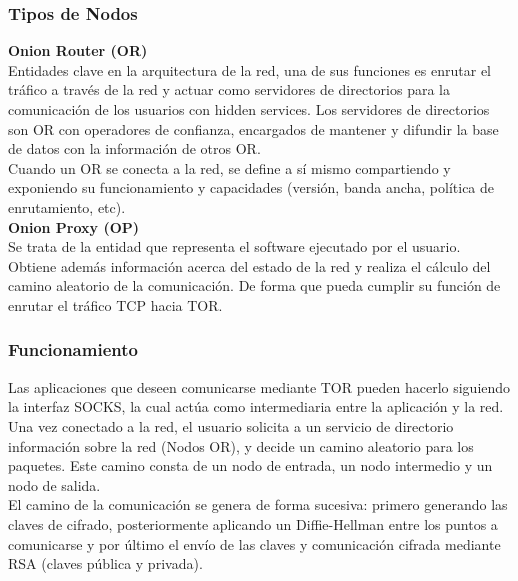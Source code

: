 \subsubsection {Tipos de Nodos}

\textbf {Onion Router (OR)} \\
Entidades clave en la arquitectura de la red, una de sus funciones es enrutar el tráfico a través de la red y actuar como servidores de directorios para la comunicación de los usuarios con hidden services. Los servidores de directorios son OR con operadores de confianza, encargados de mantener y difundir la base de datos con la información de otros OR. \\

Cuando un OR se conecta a la red, se define a sí mismo compartiendo y exponiendo su funcionamiento y capacidades (versión, banda ancha, política de enrutamiento, etc). \\

\textbf {Onion Proxy (OP)} \\
Se trata de la entidad que representa el software ejecutado por el usuario. Obtiene además información acerca del estado de la red y realiza el cálculo del camino aleatorio de la comunicación. De forma que pueda cumplir su función de enrutar el tráfico TCP hacia TOR.

\subsubsection {Funcionamiento}

Las aplicaciones que deseen comunicarse mediante TOR pueden hacerlo siguiendo la interfaz SOCKS, la cual actúa como intermediaria entre la aplicación y la red. \\

Una vez conectado a la red, el usuario solicita a un servicio de directorio información sobre la red (Nodos OR), y decide un camino aleatorio para los paquetes. Este camino consta de un nodo de entrada, un nodo intermedio y un nodo de salida. \\

El camino de la comunicación se genera de forma sucesiva: primero generando las claves de cifrado, posteriormente aplicando un Diffie-Hellman\cite{WikiDiffieHellman} entre los puntos a comunicarse y por último el envío de las claves y comunicación cifrada mediante RSA (claves pública y privada). \\


